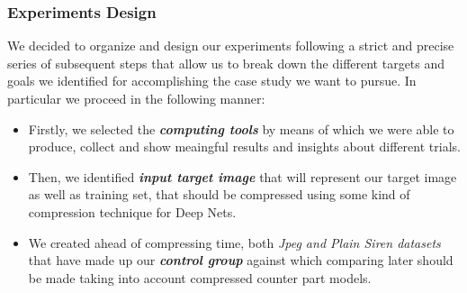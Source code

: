 





\begin{frame}
\frametitle{Experiments Design}
We decided to organize and design our experiments following a strict and precise series of subsequent steps that allow us to break down the different targets and goals
we identified for accomplishing the case study we want to pursue. In particular we proceed in the following manner:

\begin{itemize}

\item Firstly, we selected the \textbf{\textit{computing tools}} by means of which we were able to produce, collect and show meaingful results and insights about different trials.
\item Then, we identified \textbf{\textit{input target image}} that will represent our target image as well as training set, that should be compressed using some kind of compression technique
for Deep Nets.
\item We created ahead of compressing time, both \textit{Jpeg and Plain Siren datasets} that have made up our \textbf{\textit{control group}} against which comparing later
should be made taking into account compressed counter part models.

\end{itemize}
\end{frame}